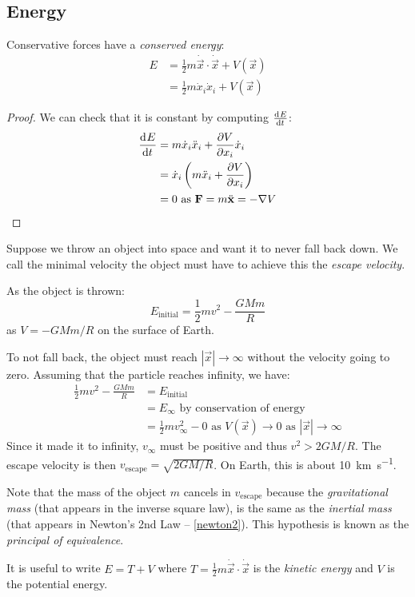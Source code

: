\documentclass[../main.tex]{subfiles}
\begin{document}
\subsection{Energy}
\label{energySec}
\begin{proposition}
  Conservative forces have a \textit{conserved energy}:
  \begin{align*}
    E &= \frac{1}{2}m \dot{\vec{x}} \cdot \dot{\vec{x}} + V(\vec{x}) \\
      &= \frac{1}{2}m \dot{x}_i \dot{x}_i + V(\vec{x})
  \end{align*}
\end{proposition}
\begin{proof}
  We can check that it is constant by computing $\deriv{E}{t}$:
  \begin{align*}
    \deriv{E}{t} &= m \dot{x}_i \ddot{x}_i + \pderiv{V}{x_i}\dot{x}_i \\
    &= \dot{x}_i\left(m \ddot{x}_i + \pderiv{V}{x_i}\right) \\
    &= 0 \text{ as $\vec{F} = m \ddot{\vec{x}} = -\nabla V$}
  \end{align*}
\end{proof}
\begin{example}
  \label{escapeVelocity}
  Suppose we throw an object into space and want it to never fall back down.
  We call the minimal velocity the object must have to achieve this the \textit{escape velocity}.

  As the object is thrown:
  \[
    E_{\text{initial}} = \frac{1}{2}mv^2 - \frac{GMm}{R}
  \]
  as $V = - GMm/R$ on the surface of Earth.

  To not fall back, the object must reach $|\vec{x}| \to \infty$ without the velocity going to zero.
  Assuming that the particle reaches infinity, we have:
  \begin{align*}
    \frac{1}{2}mv^2 - \frac{GMm}{R} &= E_{\text{initial}} \\
                                    &= E_{\infty} \text{ by conservation of energy}\\
                                    &= \frac{1}{2}mv^{2}_{\infty} - 0 \text{ as $V(\vec{x}) \to 0$ as $|\vec{x}| \to \infty$}
  \end{align*}
  Since it made it to infinity, $v_{\infty}$ must be positive and thus $v^2 > 2GM/R$.
  The escape velocity is then $v_{\text{escape}} = \sqrt{2GM/R}$.
  On Earth, this is about \qty{10}{\kilo\metre\second^{-1}}.

  Note that the mass of the object $m$ cancels in $v_{\text{escape}}$ because the \textit{gravitational mass} (that appears in the inverse square law), is the same as the \textit{inertial mass} (that appears in Newton's 2nd Law -- \cref{newton2}).
  This hypothesis is known as the \textit{principal of equivalence}.
\end{example}
It is useful to write $E = T + V$ where $T = \frac{1}{2} m \dot{\vec{x}} \cdot \dot{\vec{x}}$ is the \textit{kinetic energy} and $V$ is the potential energy.
\end{document}
